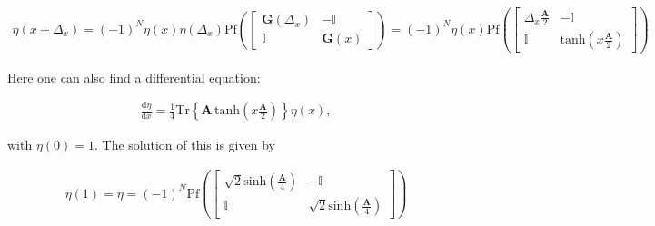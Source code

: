 \documentclass{article}
\begin{document}
	\begin{align}
		\eta\left(x + \Delta_{x} \right) = \left(-1\right)^{N}\eta\left(x\right)\eta\left(\Delta_{x} \right)\mathrm{Pf}\left( \begin{bmatrix}
			\boldsymbol{G}\left(\Delta_{x} \right)  & -\mathbb{I} \\ \mathbb{I} & \boldsymbol{G}\left(x\right)
		\end{bmatrix}  \right) =
		\left(-1\right)^{N}\eta\left(x\right)\mathrm{Pf}\left( \begin{bmatrix}
			\Delta_{x}\frac{\boldsymbol{A} }{2}   & -\mathbb{I} \\ \mathbb{I} & \mathrm{tanh} \left(x\frac{\boldsymbol{A}}{2} \right) 
		\end{bmatrix}  \right) 
	\end{align}
	
	Here one can also find a differential equation:
	
	\begin{align}
		\frac{\mathrm{d}\eta}{\mathrm{d}x} = \frac{1}{4}\mathrm{Tr} \left\{\boldsymbol{A}\,\mathrm{tanh} \left(x\frac{\boldsymbol{A} }{2} \right) \right\} \eta\left(x\right),
	\end{align}
	
	with $\eta\left(0\right) = 1$. The solution of this is given by
	
	\begin{align}
		\eta\left(1\right) = \eta = \left(-1\right)^{N}\mathrm{Pf}\left(\begin{bmatrix}
			 \sqrt{2} \mathrm{sinh} \left(\frac{\boldsymbol{A} }{4} \right)  & -\mathbb{I} \\
			 \mathbb{I} & \sqrt{2} \mathrm{sinh} \left(\frac{\boldsymbol{A} }{4} \right)  
		\end{bmatrix} \right) 
	\end{align}
	
	
	
	
	
	
	
	
	
	
	
\end{document}
